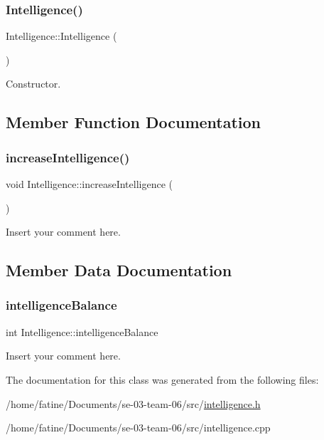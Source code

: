 \subsubsection{\texorpdfstring{Intelligence()}{Intelligence()}}
{\footnotesize\ttfamily Intelligence\+::\+Intelligence (\begin{DoxyParamCaption}{ }\end{DoxyParamCaption})}

Constructor. 

\subsection{Member Function Documentation}
\mbox{\label{classIntelligence_ad822db7ef4eef6c1f797f65c73fec3f0}} 
\subsubsection{\texorpdfstring{increase\+Intelligence()}{increaseIntelligence()}}
{\footnotesize\ttfamily void Intelligence\+::increase\+Intelligence (\begin{DoxyParamCaption}{ }\end{DoxyParamCaption})}

Insert your comment here. 

\subsection{Member Data Documentation}
\mbox{\label{classIntelligence_a20fc418262dd34db0d9e99d81d6a7544}} 
\subsubsection{\texorpdfstring{intelligence\+Balance}{intelligenceBalance}}
{\footnotesize\ttfamily int Intelligence\+::intelligence\+Balance}

Insert your comment here. 

The documentation for this class was generated from the following files\+:\begin{DoxyCompactItemize}
\item 
/home/fatine/\+Documents/se-\/03-\/team-\/06/src/\hyperlink{intelligence_8h}{intelligence.\+h}\item 
/home/fatine/\+Documents/se-\/03-\/team-\/06/src/intelligence.\+cpp\end{DoxyCompactItemize}
